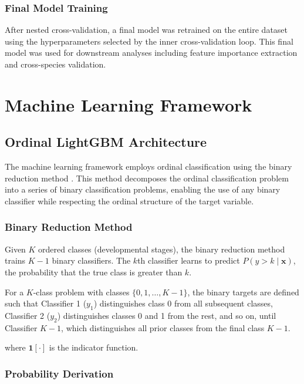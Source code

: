 \subsubsection{Final Model Training}

After nested cross-validation, a final model was retrained on the entire dataset using the hyperparameters selected by the inner cross-validation loop. This final model was used for downstream analyses including feature importance extraction and cross-species validation.


\section{Machine Learning Framework}\label{sec:methods:ml}

\subsection{Ordinal LightGBM Architecture}

The machine learning framework employs ordinal classification using the binary reduction method \parencite{frank_simple_2001}. This method decomposes the ordinal classification problem into a series of binary classification problems, enabling the use of any binary classifier while respecting the ordinal structure of the target variable.

\subsubsection{Binary Reduction Method}

Given $K$ ordered classes (developmental stages), the binary reduction method trains $K-1$ binary classifiers. The $k$th classifier learns to predict $P(y > k \mid \mathbf{x})$, the probability that the true class is greater than $k$.

For a $K$-class problem with classes $\{0, 1, \ldots, K-1\}$, the binary targets are defined such that Classifier 1 ($y_1$) distinguishes class 0 from all subsequent classes, Classifier 2 ($y_2$) distinguishes classes 0 and 1 from the rest, and so on, until Classifier $K-1$, which distinguishes all prior classes from the final class $K-1$.

where $\mathbf{1}[\cdot]$ is the indicator function.

\subsubsection{Probability Derivation}

